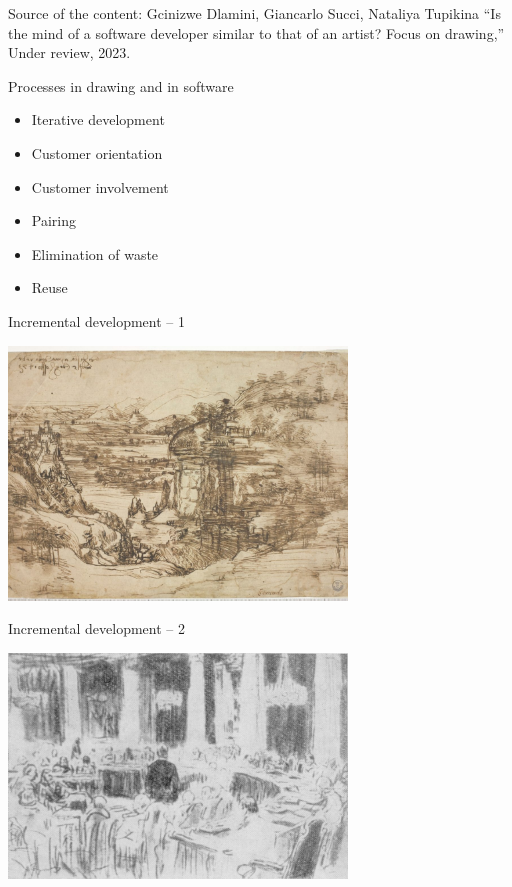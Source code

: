 \documentclass{beamer}
\begin{document}
\begin{frame}
\begin{center}
\tiny
Source of the content: Gcinizwe Dlamini, Giancarlo Succi, Nataliya Tupikina ``Is the mind of a software developer similar to that of an artist? Focus on drawing,'' Under review, 2023.
\end{center}
\end{frame}

\begin{frame}
{\centerline{Processes in drawing and in software}}

\begin{itemize}
\item Iterative development
\item Customer orientation
\item Customer involvement
\item Pairing
\item Elimination of waste
\item Reuse
 \end{itemize}

\end{frame}


\begin{frame}
{\centerline{Incremental development -- 1}}

\begin{center}
\includegraphics[width=9cm]{P2023.AIBCCSS.Drawing/Leonardo.jpg}
\end{center}

\end{frame}

\begin{frame}
{\centerline{Incremental development -- 2}}

\begin{center}
\includegraphics[width=9cm]{P2023.AIBCCSS.Drawing/repin_sketch.jpg}
\end{center}

\end{frame}
\end{document}
